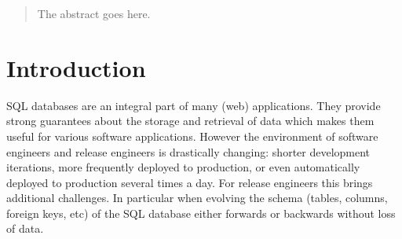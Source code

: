 \documentclass[conference]{IEEEtran}
\begin{document}
\begin{abstract}
The abstract goes here.

\end{abstract}





%
\IEEEpeerreviewmaketitle



\section{Introduction} %


SQL databases are an integral part of many (web) applications. They provide strong guarantees about the storage and retrieval of data which makes them useful for various software applications. However the environment of software engineers and release engineers is drastically changing: shorter development iterations, more frequently deployed to production, or even automatically deployed to production several times a day. For release engineers this brings additional challenges. In particular when evolving the schema (tables, columns, foreign keys, etc) of the SQL database either forwards or backwards without loss of data.
\end{document}
